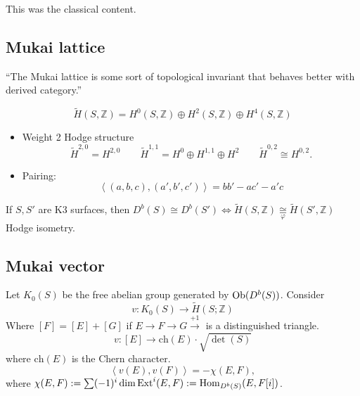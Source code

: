 This was the classical content.

\subsection{Mukai lattice}
\label{subsection-Mukai-lattice}

``The Mukai lattice is some sort of topological invariant that behaves better 
with derived category.''

$$
\tilde{H}(S,\mathbb{Z})
=H^{0}(S,\mathbb{Z})\oplus H^{2}(S,\mathbb{Z})\oplus H^{4}(S,\mathbb{Z})
$$
\begin{itemize}
\item Weight 2 Hodge structure
$$
\tilde{H}^{2,0}=H^{2,0}\qquad \tilde{H}^{1,1}=H^0\oplus H^{1,1}\oplus H^2
\qquad \tilde{H}^{0,2}\cong H^{0,2}.
$$
\item Pairing:
$$
\left<(a,b,c),(a',b',c')\right>=bb'-ac'-a'c
$$
\end{itemize}

\begin{theorem}
\label{theorem-Mukai-Orlov}
If $S,S'$ are K3 surfaces, then $D^b(S) \cong D^b(S')\iff
\tilde{H}(S,\mathbb{Z})\underset{\varphi}{\cong}\tilde{H}(S',\mathbb{Z})$ Hodge
isometry.
\end{theorem}

\subsection{Mukai vector}
\label{subsection-Mukai-vector}

Let $K_0(S)$ be the free abelian group generated by $\mathop{\mathrm{Ob}}\nolimits(D^b(S))$. Consider
$$
v:K_0(S)\to \tilde{H}(S;\mathbb{Z})
$$
Where $[F]=[E]+[G]$ if $E \to F \to G \xrightarrow{+1}$ is a distinguished
triangle.
$$
v:[E] \to \text{ch}(E)\cdot \sqrt{\det(S)}
$$
where $\text{ch}(E)$ is the Chern character.
$$
\left<v(E),v(F)\right>=-\chi(E,F),
$$
where $\chi(E,F):=\sum(-1)^i\dim\text{Ext}^i(E,F):=\mathop{\mathrm{Hom}}\nolimits_{D^b(S)}(E,F[i])$.


